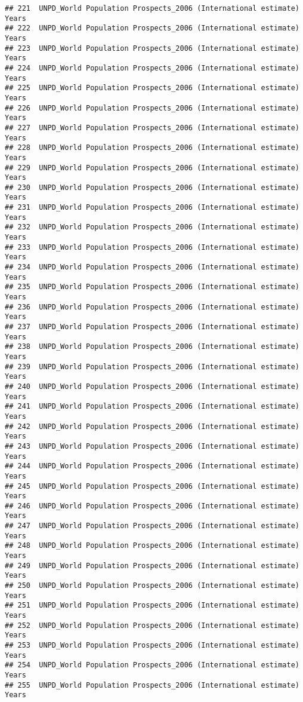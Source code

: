 \documentclass[]{article}
\begin{document}
\begin{verbatim}
## 221  UNPD_World Population Prospects_2006 (International estimate) Years
## 222  UNPD_World Population Prospects_2006 (International estimate) Years
## 223  UNPD_World Population Prospects_2006 (International estimate) Years
## 224  UNPD_World Population Prospects_2006 (International estimate) Years
## 225  UNPD_World Population Prospects_2006 (International estimate) Years
## 226  UNPD_World Population Prospects_2006 (International estimate) Years
## 227  UNPD_World Population Prospects_2006 (International estimate) Years
## 228  UNPD_World Population Prospects_2006 (International estimate) Years
## 229  UNPD_World Population Prospects_2006 (International estimate) Years
## 230  UNPD_World Population Prospects_2006 (International estimate) Years
## 231  UNPD_World Population Prospects_2006 (International estimate) Years
## 232  UNPD_World Population Prospects_2006 (International estimate) Years
## 233  UNPD_World Population Prospects_2006 (International estimate) Years
## 234  UNPD_World Population Prospects_2006 (International estimate) Years
## 235  UNPD_World Population Prospects_2006 (International estimate) Years
## 236  UNPD_World Population Prospects_2006 (International estimate) Years
## 237  UNPD_World Population Prospects_2006 (International estimate) Years
## 238  UNPD_World Population Prospects_2006 (International estimate) Years
## 239  UNPD_World Population Prospects_2006 (International estimate) Years
## 240  UNPD_World Population Prospects_2006 (International estimate) Years
## 241  UNPD_World Population Prospects_2006 (International estimate) Years
## 242  UNPD_World Population Prospects_2006 (International estimate) Years
## 243  UNPD_World Population Prospects_2006 (International estimate) Years
## 244  UNPD_World Population Prospects_2006 (International estimate) Years
## 245  UNPD_World Population Prospects_2006 (International estimate) Years
## 246  UNPD_World Population Prospects_2006 (International estimate) Years
## 247  UNPD_World Population Prospects_2006 (International estimate) Years
## 248  UNPD_World Population Prospects_2006 (International estimate) Years
## 249  UNPD_World Population Prospects_2006 (International estimate) Years
## 250  UNPD_World Population Prospects_2006 (International estimate) Years
## 251  UNPD_World Population Prospects_2006 (International estimate) Years
## 252  UNPD_World Population Prospects_2006 (International estimate) Years
## 253  UNPD_World Population Prospects_2006 (International estimate) Years
## 254  UNPD_World Population Prospects_2006 (International estimate) Years
## 255  UNPD_World Population Prospects_2006 (International estimate) Years

\end{verbatim}
\end{document}
